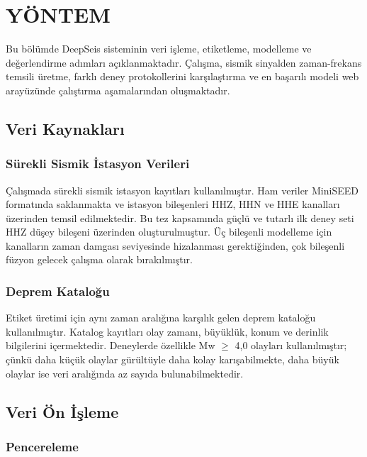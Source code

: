 \chapter{YÖNTEM}

Bu bölümde DeepSeis sisteminin veri işleme, etiketleme, modelleme ve değerlendirme adımları açıklanmaktadır. Çalışma, sismik sinyalden zaman-frekans temsili üretme, farklı deney protokollerini karşılaştırma ve en başarılı modeli web arayüzünde çalıştırma aşamalarından oluşmaktadır.

\section{Veri Kaynakları}

\subsection{Sürekli Sismik İstasyon Verileri}

Çalışmada sürekli sismik istasyon kayıtları kullanılmıştır. Ham veriler MiniSEED formatında saklanmakta ve istasyon bileşenleri HHZ, HHN ve HHE kanalları üzerinden temsil edilmektedir. Bu tez kapsamında güçlü ve tutarlı ilk deney seti HHZ düşey bileşeni üzerinden oluşturulmuştur. Üç bileşenli modelleme için kanalların zaman damgası seviyesinde hizalanması gerektiğinden, çok bileşenli füzyon gelecek çalışma olarak bırakılmıştır.

\subsection{Deprem Kataloğu}

Etiket üretimi için aynı zaman aralığına karşılık gelen deprem kataloğu kullanılmıştır. Katalog kayıtları olay zamanı, büyüklük, konum ve derinlik bilgilerini içermektedir. Deneylerde özellikle Mw $\geq$ 4,0 olayları kullanılmıştır; çünkü daha küçük olaylar gürültüyle daha kolay karışabilmekte, daha büyük olaylar ise veri aralığında az sayıda bulunabilmektedir.

\section{Veri Ön İşleme}

\subsection{Pencereleme}

